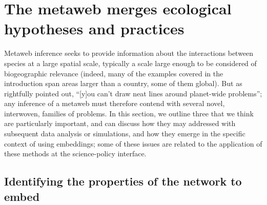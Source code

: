 \section{The metaweb merges ecological hypotheses and
practices}\label{the-metaweb-merges-ecological-hypotheses-and-practices}

Metaweb inference seeks to provide information about the interactions
between species at a large spatial scale, typically a scale large enough
to be considered of biogeographic relevance (indeed, many of the
examples covered in the introduction span areas larger than a country,
some of them global). But as \cite{Herbert1965Dune} rightfully pointed out,
``[y]ou can't draw neat lines around planet-wide problems''; any
inference of a metaweb must therefore contend with several novel,
interwoven, families of problems. In this section, we outline three that
we think are particularly important, and can discuss how they may
addressed with subsequent data analysis or simulations, and how they
emerge in the specific context of using embeddings; some of these issues
are related to the application of these methods at the science-policy
interface.

\subsection{Identifying the properties of the network to
embed}\label{identifying-the-properties-of-the-network-to-embed}

